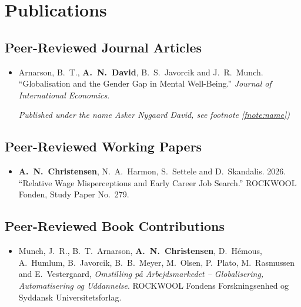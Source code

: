 \documentclass[12pt,a4paper]{article}
\newlength{\cvindent}
\newenvironment{cvbody}{%
  \begin{adjustwidth}{\cvindent}{}%
  \setlength{\parindent}{0pt}%
}{%
  \end{adjustwidth}%
}
\begin{document}
\section{Publications}

\subsection*{\normalsize Peer-Reviewed Journal Articles}
\begin{cvbody}
\begin{itemize}[leftmargin=1.5em, labelsep=0.5em, itemsep=4pt, parsep=0pt]
    \item Arnarson, B.~T., \textbf{A.~N.~David}, B.~S.~Javorcik and J.~R.~Munch. ``Globalisation and the Gender Gap in Mental Well-Being.'' \textit{Journal of International Economics}. \par 
    \textit{Published under the name Asker Nygaard David, see footnote \ref{fnote:name})}
\end{itemize}
\end{cvbody}

\subsection*{\normalsize Peer-Reviewed Working Papers}
\begin{cvbody}
\begin{itemize}[leftmargin=1.5em, labelsep=0.5em, itemsep=4pt, parsep=0pt]
    \item \textbf{A.~N.~Christensen}, N.~A.~Harmon, S.~Settele and D.~Skandalis. 2026. ``Relative Wage Misperceptions and Early Career Job Search.'' ROCKWOOL Fonden, Study Paper No.~279.
\end{itemize}
\end{cvbody}

\subsection*{\normalsize Peer-Reviewed Book Contributions}
\begin{cvbody}
\begin{itemize}[leftmargin=1.5em, labelsep=0.5em, itemsep=4pt, parsep=0pt]
    \item Munch, J.~R., B.~T.~Arnarson, \textbf{A.~N.~Christensen}, D.~H\'emous, A.~Humlum, B.~Javorcik, B.~B.~Meyer, M.~Olsen, P.~Plato, M.~Rasmussen and E.~Vestergaard, \textit{Omstilling p\aa{} Arbejdsmarkedet -- Globalisering, Automatisering og Uddannelse}. ROCKWOOL Fondens Forskningsenhed og Syddansk Universitetsforlag.
\end{itemize}
\end{cvbody}
\end{document}
